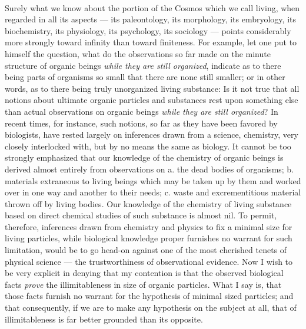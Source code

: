 \documentclass[a4paper, 11pt, oneside, polutonikogreek, english]{article}
\begin{document}
\paragraph{}
Surely what we know about the portion of the Cosmos which we call living, when regarded in all its aspects --- its paleontology, its morphology, its embryology, its biochemistry, its physiology, its psychology, its sociology --- points considerably more strongly toward infinity than toward finiteness. For example, let one put to himself the question, what do the observations so far made on the minute structure of organic beings \emph{while they are still organized}, indicate as to there being parts of organisms so small that there are none still smaller; or in other words, as to there being truly unorganized living substance: Is it not true that all notions about ultimate organic particles and substances rest upon something else than actual observations on organic beings \emph{while they are still organized}? In recent times, for instance, such notions, so far as they have been favored by biologists, have rested largely on inferences drawn from a science, chemistry, very closely interlocked with, but by no means the same as biology. It cannot be too strongly emphasized that our knowledge of the chemistry of organic beings is derived almost entirely from observations on a. the dead bodies of organisms; b. materials extraneous to living beings which may be taken up by them and worked over in one way and another to their needs; c. waste and excrementitious material thrown off by living bodies. Our knowledge of the chemistry of living substance based on direct chemical studies of such substance is almost nil. To permit, therefore, inferences drawn from chemistry and physics to fix a minimal size for living particles, while biological knowledge proper furnishes no warrant for such limitation, would be to go head-on against one of the most cherished tenets of physical science --- the trustworthiness of observational evidence. Now I wish to be very explicit in denying that my contention is that the observed biological facts \emph{prove} the illimitableness in size of organic particles. What I say is, that those facts furnish no warrant for the hypothesis of minimal sized particles; and that consequently, if we are to make any hypothesis on the subject at all, that of illimitableness is far better grounded than its opposite.
\end{document}
